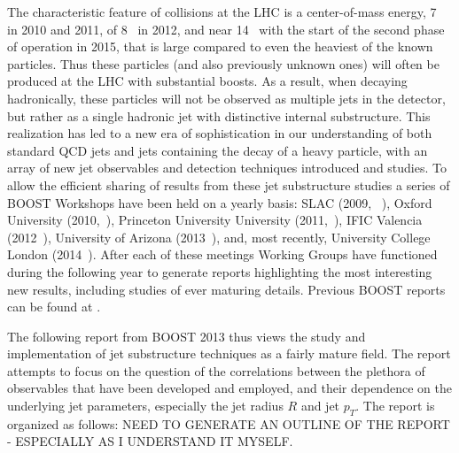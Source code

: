 The characteristic feature of collisions at the LHC is a center-of-mass energy, 7~\tev{} in 2010 and 2011, 
of 8~\tev{} in 2012, and near 14~\tev{} with the start of the second phase of operation in 2015, that is large
compared to even the heaviest of the known particles.  Thus these particles (and also previously unknown ones)
will often be produced at the LHC with
substantial boosts.  As a result, when decaying hadronically, these particles will not be observed as multiple jets in the detector, but rather
as a single hadronic jet with distinctive internal substructure.  This realization has led to a new era of sophistication
in our understanding of  both standard QCD jets and jets containing the decay of a heavy particle, with an array
of new jet observables and detection techniques introduced and studies.  To allow the efficient sharing of 
results from these jet substructure studies a series of BOOST Workshops have been held on a yearly basis:
SLAC (2009, ~\cite{boost09}), 
Oxford University (2010,~\cite{boost10}), Princeton 
University University (2011,~\cite{boost11}),  IFIC Valencia (2012~\cite{boost12}), 
University of Arizona (2013~\cite{boost13}), and, most recently, University College London (2014~\cite{boost2014}).
After each of these meetings Working Groups have functioned during the following year to generate reports
highlighting the most interesting new results, including studies of ever maturing details.   Previous BOOST reports
can be found at \cite{Abdesselam:2010pt,Altheimer:2012mn,Altheimer:2013yza}.

The following report from BOOST 2013 thus views the study and implementation of jet substructure techniques as a fairly
mature field. The report attempts to focus on the question of the correlations between the plethora of observables that have been developed 
and employed, and their dependence on the underlying jet parameters, especially the jet radius $R$ and jet $p_T$.
The report is organized as follows:  NEED TO GENERATE AN OUTLINE OF THE REPORT - ESPECIALLY AS I UNDERSTAND IT
MYSELF.